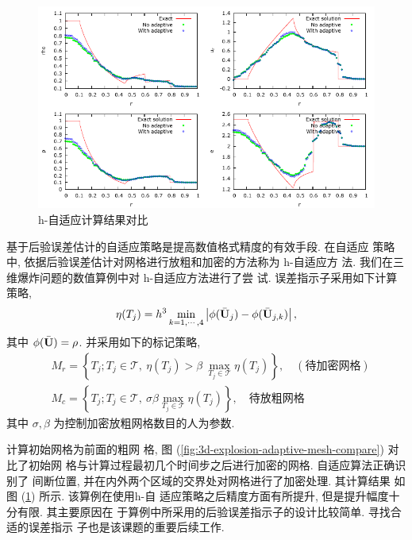 \begin{figure}[htbp]
  \centering
  \includegraphics[scale=1.2]{./Pho/Chp4/3d_explosion_adapt_multiplot.pdf}
  \caption{h-自适应计算结果对比}
  \label{fig:h-adaptive-result-compare}
\end{figure}

基于后验误差估计的自适应策略是提高数值格式精度的有效手段. 在自适应
策略中, 依据后验误差估计对网格进行放粗和加密的方法称为 h-自适应方
法. 我们在三维爆炸问题的数值算例中对 h-自适应方法进行了尝
试. 误差指示子采用如下计算策略,
\begin{equation}
  \label{eq:error-indicator}
  \eta (T_{j}) = h^{3} \min_{k=1,\cdots,4} \left|
    \phi(\bar{\bf{U}}_{j}) - \phi(\bar{\bf{U}}_{j,k}) \right|,
\end{equation}
其中 $\phi(\bar{{\bf{U}}}) = \rho$. 并采用如下的标记策略,
\begin{equation}
  \label{eq:marking-strategy}
  \begin{aligned}
    & M_{r} = \left\{ T_{j}; T_{j}\in \mathcal{T}, ~\eta (T_{j})>
      \beta ~ \max_{T_{j}\in \mathcal{T}} \eta(T_{j})  \right\},
    \quad (\mbox{待加密网格})\\
    & M_{c} = \left\{ T_{j}; T_{j} \in \mathcal{T}, ~\sigma \beta
      \max_{T_{j}\in \mathcal{T}} \eta (T_{j}) \right\}, \quad
    \mbox{待放粗网格}
  \end{aligned}
\end{equation}
其中 $\sigma, \beta$ 为控制加密放粗网格数目的人为参数.

计算初始网格为前面的粗网
格, 图 (\ref{fig:3d-explosion-adaptive-mesh-compare}) 对比了初始网
格与计算过程最初几个时间步之后进行加密的网格. 自适应算法正确识别了
间断位置, 并在内外两个区域的交界处对网格进行了加密处理. 其计算结果
如图 (\ref{fig:h-adaptive-result-compare}) 所示. 该算例在使用h-自
适应策略之后精度方面有所提升, 但是提升幅度十分有限. 其主要原因在
于算例中所采用的后验误差指示子的设计比较简单. 寻找合适的误差指示
子也是该课题的重要后续工作.

